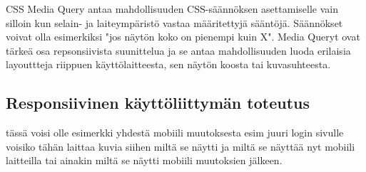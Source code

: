 CSS Media Query antaa mahdollisuuden CSS-säännöksen asettamiselle vain silloin kun selain- ja laiteympäristö vastaa määritettyjä sääntöjä. 
Säännökset voivat olla esimerkiksi "jos näytön koko on pienempi kuin X".
Media Queryt ovat tärkeä osa repsonsiivista suunittelua ja se antaa mahdollisuuden luoda erilaisia layouttteja riippuen käyttölaitteesta, sen näytön koosta tai kuvasuhteesta.
\medskip










\iffalse

\subsection*{Responsiivinen käyttöliittymän toteutus}



tässä voisi olle esimerkki yhdestä mobiili muutoksesta esim juuri login sivulle
voisiko tähän laittaa kuvia siihen miltä se näytti ja miltä se näyttää nyt mobiili laitteilla
tai ainakin miltä se näytti mobiili muutoksien jälkeen. 



